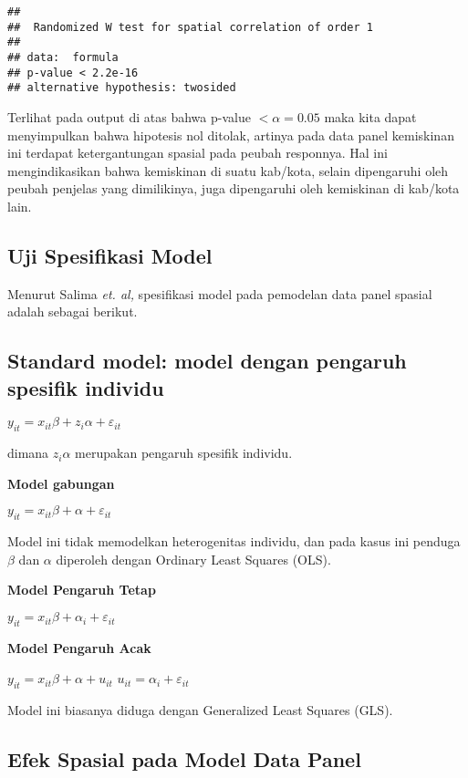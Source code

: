 \documentclass[
]{book}
\begin{document}
\begin{verbatim}
## 
##  Randomized W test for spatial correlation of order 1
## 
## data:  formula
## p-value < 2.2e-16
## alternative hypothesis: twosided
\end{verbatim}

Terlihat pada output di atas bahwa p-value \(<\alpha=0.05\) maka kita dapat menyimpulkan bahwa hipotesis nol ditolak, artinya pada data panel kemiskinan ini terdapat ketergantungan spasial pada peubah responnya. Hal ini mengindikasikan bahwa kemiskinan di suatu kab/kota, selain dipengaruhi oleh peubah penjelas yang dimilikinya, juga dipengaruhi oleh kemiskinan di kab/kota lain.

\hypertarget{uji-spesifikasi-model}{%
\subsection{Uji Spesifikasi Model}\label{uji-spesifikasi-model}}

Menurut Salima \emph{et. al,} spesifikasi model pada pemodelan data panel spasial adalah sebagai berikut.

\hypertarget{standard-model-model-dengan-pengaruh-spesifik-individu}{%
\subsection{Standard model: model dengan pengaruh spesifik individu}\label{standard-model-model-dengan-pengaruh-spesifik-individu}}

\(y_{it}=x_{it}\beta + z_i\alpha + \varepsilon_{it}\)

dimana \(z_i\alpha\) merupakan pengaruh spesifik individu.

\textbf{Model gabungan}

\(y_{it}=x_{it}\beta + \alpha + \varepsilon_{it}\)

Model ini tidak memodelkan heterogenitas individu, dan pada kasus ini penduga \(\beta\) dan \(\alpha\) diperoleh dengan Ordinary Least Squares (OLS).

\textbf{Model Pengaruh Tetap}

\(y_{it}=x_{it}\beta + \alpha_i + \varepsilon_{it}\)

\textbf{Model Pengaruh Acak}

\(y_{it}=x_{it}\beta + \alpha + u_{it}\)
\(u_{it}=\alpha_i + \varepsilon_{it}\)

Model ini biasanya diduga dengan Generalized Least Squares (GLS).

\hypertarget{efek-spasial-pada-model-data-panel}{%
\subsection{Efek Spasial pada Model Data Panel}\label{efek-spasial-pada-model-data-panel}}
\end{document}
